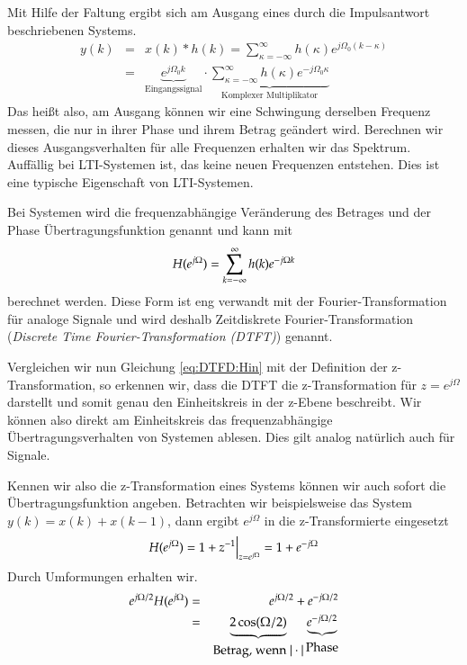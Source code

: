 Mit Hilfe der Faltung ergibt sich am Ausgang eines durch die
Impulsantwort beschriebenen Systems.
\begin{eqnarray}\label{eq:fTrafo:Bsp}
    y(k)& = &x(k)\ast h(k) = \sum_{\kappa = -\infty}^{\infty} h(\kappa)
    e^{j\Omega_0(k-\kappa)}\\
    &= & \underbrace{e^{j\Omega_0 k}}_{\mbox{Eingangssignal}} \cdot
    \underbrace{\sum_{\kappa = -\infty}^{\infty} h(\kappa) e^{-j\Omega_0
    \kappa}}_{\mbox{Komplexer Multiplikator}}
\end{eqnarray}
Das heißt also, am Ausgang können wir eine Schwingung derselben
Frequenz messen, die nur in ihrer Phase und ihrem Betrag geändert
wird. Berechnen wir dieses Ausgangsverhalten für alle Frequenzen
erhalten wir das Spektrum. Auffällig bei LTI-Systemen ist, das
keine neuen Frequenzen entstehen. Dies ist eine typische
Eigenschaft von LTI-Systemen.


Bei Systemen wird die frequenzabhängige Veränderung des Betrages
und der Phase Übertragungsfunktion genannt und kann mit
\begin{equation}\label{eq:DTFD:Hin}
    H (e^{j\Omega}) = \sum_{k = -\infty}^{\infty} h(k) e^{-j\Omega k}
\end{equation}
berechnet werden. Diese Form ist eng verwandt mit der
Fourier-Transformation für analoge Signale und wird deshalb
Zeitdiskrete Fourier-Transformation ({\em Discrete Time
Fourier-Transformation (DTFT)}) genannt.

Vergleichen wir nun Gleichung \ref{eq:DTFD:Hin} mit der Definition
der z-Transformation, so erkennen wir, dass die DTFT die
z-Transformation für $z = e^{j\Omega}$ darstellt und somit genau
den Einheitskreis in der z-Ebene beschreibt. Wir können also
direkt am Einheitskreis das frequenzabhängige
Übertragungsverhalten von Systemen ablesen. Dies gilt analog
natürlich auch für Signale.

Kennen wir also die z-Transformation eines Systems können wir auch
sofort die Übertragungsfunktion angeben. Betrachten wir
beispielsweise das System $y(k) = x(k) + x(k-1)$, dann ergibt
$e^{j\Omega}$ in die z-Transformierte eingesetzt
\begin{equation}\label{eq:fTRafo:Bsp:zTrafoFTrafo}
    H (e^{j\Omega}) = 1+z^{-1} \Big|_{z = e^{j\Omega}} = 1+e^{-j\Omega}
\end{equation}
Durch Umformungen erhalten wir.
\begin{eqnarray}\label{eq:fTrafo:BspUebrtragungF}
   e^{j\Omega / 2} H (e^{j\Omega}) &= & e^{j \Omega / 2}+e^{-j\Omega / 2}\\
   & = & \underbrace{2 \cos(\Omega / 2)}_{\mbox{Betrag, wenn $|\cdot|$}}
   \underbrace{e^{-j\Omega / 2}}_{\mbox{Phase}}
\end{eqnarray}

